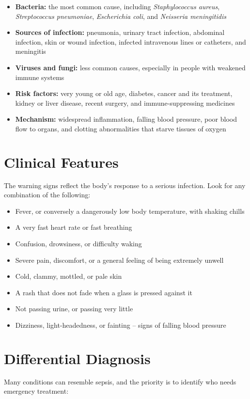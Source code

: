 \begin{itemize}
    \item \textbf{Bacteria:} the most common cause, including \textit{Staphylococcus aureus}, \textit{Streptococcus pneumoniae}, \textit{Escherichia coli}, and \textit{Neisseria meningitidis}
    \item \textbf{Sources of infection:} pneumonia, urinary tract infection, abdominal infection, skin or wound infection, infected intravenous lines or catheters, and meningitis
    \item \textbf{Viruses and fungi:} less common causes, especially in people with weakened immune systems
    \item \textbf{Risk factors:} very young or old age, diabetes, cancer and its treatment, kidney or liver disease, recent surgery, and immune-suppressing medicines
    \item \textbf{Mechanism:} widespread inflammation, falling blood pressure, poor blood flow to organs, and clotting abnormalities that starve tissues of oxygen
\end{itemize}

\section*{Clinical Features}
The warning signs reflect the body's response to a serious infection. Look for any combination of the following:

\begin{itemize}
    \item Fever, or conversely a dangerously low body temperature, with shaking chills
    \item A very fast heart rate or fast breathing
    \item Confusion, drowsiness, or difficulty waking
    \item Severe pain, discomfort, or a general feeling of being extremely unwell
    \item Cold, clammy, mottled, or pale skin
    \item A rash that does not fade when a glass is pressed against it
    \item Not passing urine, or passing very little
    \item Dizziness, light-headedness, or fainting -- signs of falling blood pressure
\end{itemize}

\section*{Differential Diagnosis}
Many conditions can resemble sepsis, and the priority is to identify who needs emergency treatment:

